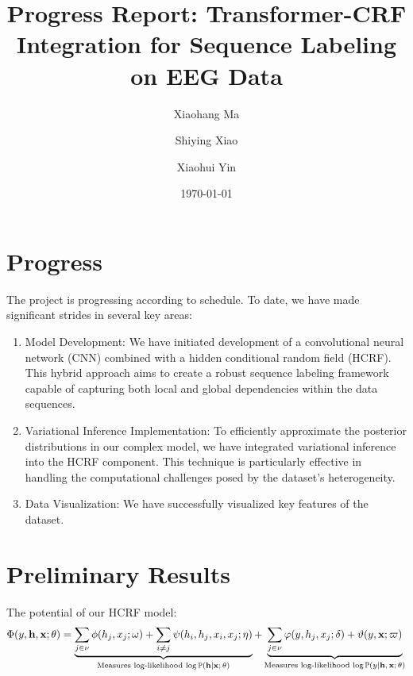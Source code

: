 \documentclass[10pt]{article}
\newcommand{\PP}{{\mathbb{P}}}
\newcommand{\hb}{\mathbf{h}}
\newcommand{\xb}{\mathbf{x}}
\begin{document}
\title{Progress Report: Transformer-CRF Integration for Sequence Labeling on
EEG Data}

\author[1]{Xiaohang Ma}
\author[2]{Shiying Xiao}
\author[2]{Xiaohui Yin}


\date{\today}

\maketitle


\section{Progress}


The project is progressing according to schedule. To date, we have made
significant strides in several key areas:
\begin{enumerate}
\item Model Development:
We have initiated development of a convolutional neural network (CNN) combined
with a hidden conditional random field (HCRF). This hybrid approach aims to
create a robust sequence labeling framework capable of capturing both local
and global dependencies within the data sequences.
\item Variational Inference Implementation:
To efficiently approximate the posterior distributions in our complex model,
we have integrated variational inference into the HCRF component.
This technique is particularly effective in handling the computational
challenges posed by the dataset's heterogeneity.
\item Data Visualization:
We have successfully visualized key features of the dataset.
\end{enumerate}


\section{Preliminary Results}


The potential of our HCRF model:
\begin{equation*}
\Phi(y, \hb, \xb; \theta) = \underbrace{
\sum_{j \in \nu} \phi(h_j, x_j; \omega) +
\sum_{i \neq j} \psi(h_i, h_j, x_i, x_j; \eta)}_{
\textrm{Measures log-likelihood $\log\PP ( \hb \vert \xb; \theta)$}}
+ \underbrace{
\sum_{j \in \nu} \varphi(y, h_j, x_j; \delta) +
\vartheta(y, \xb; \varpi)}_{
\textrm{Measures log-likelihood $\log \PP (y \vert \hb, \xb; \theta)$}}
\end{equation*}
\end{document}
